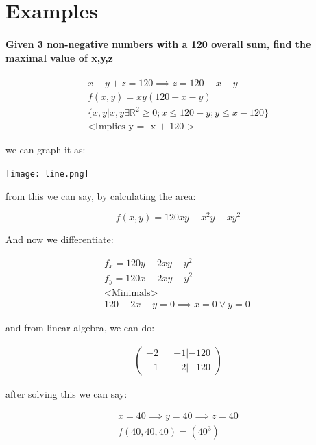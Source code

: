 \documentclass[11pt,fleqn]{book} %
\begin{document}
\section{Examples}

\paragraph*{Given 3 non-negative numbers with a 120 overall sum, find the maximal value of x,y,z}
\begin{gather}
    x+y+z=120 \implies z = 120-x-y \\
    f(x,y) = xy(120-x-y)\\
    \{ x,y | x,y \exists \mathbb{R}^2 \geq 0; x \leq 120 - y; y \leq x - 120 \} \\
    \text{<Implies y = -x + 120 >}
\end{gather}

we can graph it as:

\begin{center}
    \texttt{[image: line.png]}
\end{center}

from this we can say, by calculating the area:

\begin{equation}
    f(x,y) = 120xy -x^2y - xy^2
\end{equation}

And now we differentiate:

\begin{gather}
    f_x = 120y -2xy - y^2 \\
    f_y = 120x - 2xy -y^2 \\
    \text{<Minimals>} \\
    120 - 2x - y = 0 \implies x = 0 \vee y = 0 \
\end{gather}

and from linear algebra, we can do:

\begin{gather}
    \begin{pmatrix}
        -2 && -1 | -120 \\
        -1 && -2 | -120
    \end{pmatrix} 
\end{gather}

after solving this we can say:

\begin{gather}
    x = 40 \implies y = 40 \implies z = 40 \\
    f(40,40,40) = (40^3)
\end{gather}
\end{document}
